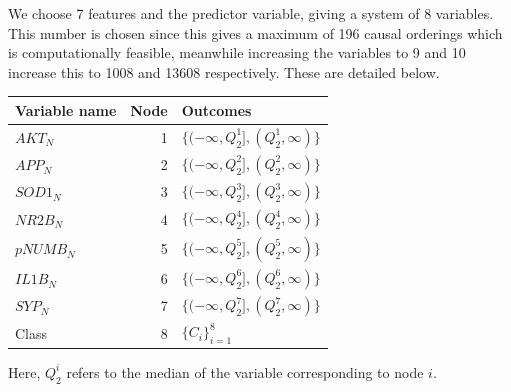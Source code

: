\documentclass{tufte-book}
\begin{document}
\begin{Definition}
We choose 7 features and the predictor variable, giving a system of 8 variables. This number is chosen since this gives a maximum of 196 causal orderings which is computationally feasible, meanwhile increasing the variables to 9 and 10 increase this to 1008 and 13608 respectively. These are detailed below.

\begin{center}
\begin{tabular}{l|r|l}
\hline
Variable name & Node & Outcomes\\
\hline
\(AKT_N\) & 1 & \(\{(-\infty, Q^1_2],(Q^1_2, \infty) \}\)\\
\(APP_N\) & 2 & \(\{(-\infty, Q^2_2],(Q^2_2, \infty) \}\)\\
\(SOD1_N\) & 3 & \(\{(-\infty, Q^3_2],(Q^3_2, \infty) \}\)\\
\(NR2B_N\) & 4 & \(\{(-\infty, Q^4_2],(Q^4_2, \infty) \}\)\\
\(pNUMB_N\) & 5 & \(\{(-\infty, Q^5_2],(Q^5_2, \infty) \}\)\\
\(IL1B_N\) & 6 & \(\{(-\infty, Q^6_2],(Q^6_2, \infty) \}\)\\
\(SYP_N\) & 7 & \(\{(-\infty, Q^7_2],(Q^7_2, \infty) \}\)\\
Class & 8 & \(\{C_i \}_{i=1}^8\)\\
\end{tabular}
\end{center}


Here, \(Q^i_2\) refers to the median of the variable corresponding to node \(i\).


\end{Definition}
\end{document}
